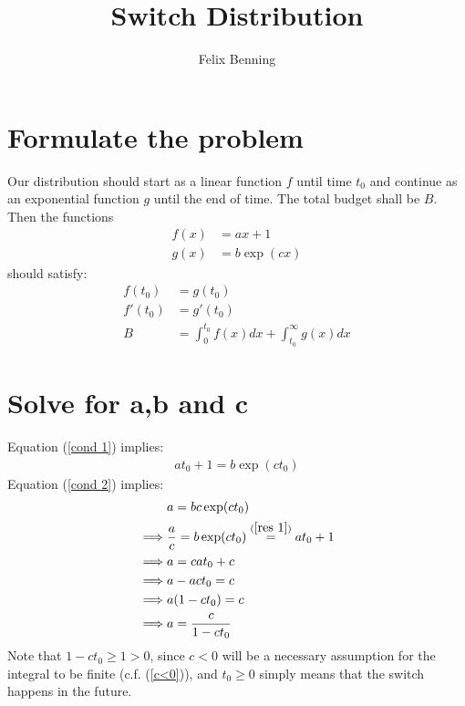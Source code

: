\documentclass[11pt, a4paper]{article}
\title{Switch Distribution}
\author{Felix Benning}
\begin{document}
    \maketitle

    \section{Formulate the problem}
    Our distribution should start as a linear function \(f\) until time \(t_0\) and continue as an exponential function \(g\) until the end of time. The total budget shall be \(B\). Then the functions
    \begin{align*}
        f(x) & = a x+1\\
        g(x) & = b \exp(cx)
    \end{align*}
    should satisfy:
    \begin{align}
        f(t_0) &= g(t_0) \label{cond 1}\\
        f'(t_0) &= g'(t_0) \label{cond 2}\\
        B &= \int_0^{t_0} f(x) dx + \int_{t_0}^\infty g(x)dx \label{cond 3}
    \end{align}
    \section{Solve for a,b and c}
    Equation (\ref{cond 1}) implies:
    \begin{align}
        at_0 +1 = b \exp(c t_0) \label{res 1}
    \end{align}
    Equation (\ref{cond 2}) implies:
    \begin{align}
        &a = b c \exp(c t_0) \nonumber\\
        \implies & \frac{a}{c} = b \exp(c t_0) \stackrel{(\ref{res 1})}{=} at_0 +1 \label{res 2}\\
        \implies & a = cat_0 + c \nonumber\\
        \implies & a - act_0 = c \nonumber\\
        \implies & a(1-c t_0) =c \nonumber\\
        \implies & a = \frac{c}{1-ct_0} \label{res a}
    \end{align}
    Note that \(1-ct_0\ge1>0\), since \(c<0\) will be a necessary assumption for the integral to be finite (c.f. (\ref{c<0})), and \(t_0\ge 0\) simply means that the switch happens in the future.
\end{document}
